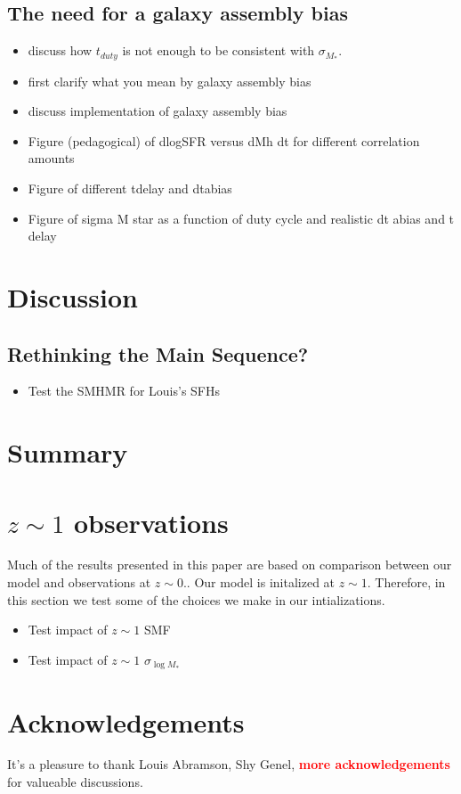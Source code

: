 \documentclass[12pt, letterpaper, preprint]{aastex}
\newcommand{\todo}[1]{{\bf \textcolor{red}{#1}}}
\newcommand{\bitem}{\begin{itemize}}
\newcommand{\eitem}{\end{itemize}}
\begin{document}
\subsection{The need for a galaxy assembly bias}
\bitem
\item discuss how $t_{duty}$ is not enough to be consistent with $\sigma_{M_*}$. 
\item first clarify what you mean by galaxy assembly bias 
\item discuss implementation of galaxy assembly bias
\item Figure (pedagogical) of dlogSFR versus dMh dt for different correlation amounts 
\item Figure of different tdelay and dtabias 
\item Figure of sigma M star as a function of duty cycle and realistic dt abias and t delay 
\eitem

\section{Discussion} \label{sec:discussion}
\subsection{Rethinking the Main Sequence?}
\bitem 
\item Test the SMHMR for Louis's SFHs 
\eitem 

\section{Summary} \label{sec:summary}


\appendix
\section{$z \sim 1$ observations} \label{app:z1}
Much of the results presented in this paper are based on comparison 
between our model and observations at $z \sim 0.$. Our model is initalized 
at $z \sim 1$. Therefore, in this section we test some of the choices 
we make in our intializations. 

\bitem
\item Test impact of $z \sim 1$ SMF
\item Test impact of $z \sim 1$ $\sigma_{\log M_*}$ 
\eitem

\section*{Acknowledgements}
It's a pleasure to thank 
    Louis Abramson, 
    Shy Genel, 
    \todo{more acknowledgements} 
for valueable discussions. 



\end{document}
